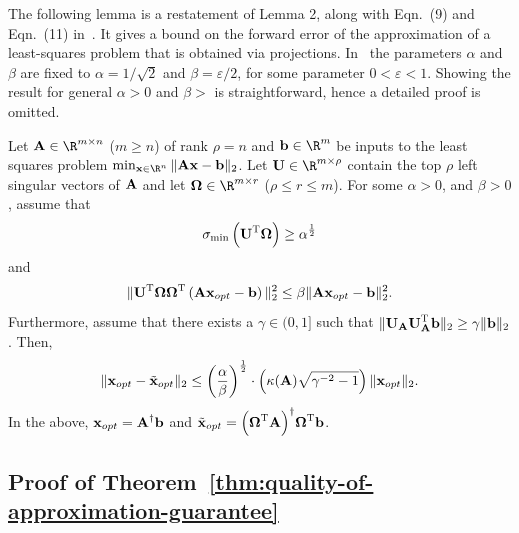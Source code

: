 The following lemma is a restatement of Lemma 2, along with Eqn.~(9) and Eqn.~(11) in~\cite{DMMS11}. It gives a bound on the forward error of the
approximation of a least-squares problem that is obtained via projections.
In~\cite{DMMS11} the parameters $\alpha$ and $\beta$ are fixed to $\alpha=1/\sqrt{2}$ and $\beta = \varepsilon/2$, for some parameter $0 < \varepsilon < 1$.
Showing the result for general $\alpha > 0$ and $\beta >$ is straightforward, hence a detailed proof is omitted.
\begin{lemma}\label{lem:last}
Let $\matA \in \R^{m \times n}$ ($m \ge n$) of rank $\rho=n$ and $\b \in \R^m$ be inputs to the least squares problem $\min_{\x \in \R^n}\TNorm{\matA \x -\b}$.
Let $\matU \in \R^{m \times \rho}$ contain the top $\rho$ left singular vectors of ${\bm{\mathrm{A}}}$ and let $\matOmega \in \R^{m \times r}$ ($\rho \le r \le m $).
For some $\alpha>0$, and $\beta > 0$, assume that
\begin{equation}\label{eqn:first}
\sigma_{\min}\left( \matU\transp \matOmega \right) \ge \alpha^{\frac{1}{2}}
\end{equation}
and
\begin{equation}\label{eqn:second}
\TNormS{\matU\transp \matOmega \matOmega\transp \left( \matA \x_{opt} - \b \right)} \le \beta \TNormS{ \matA \x_{opt} - \b }.
\end{equation}
Furthermore, assume that there exists a $\gamma \in (0,1]$ such that $ \mbox{}\|{\bm{\mathrm{U}}}_{{\bm{\mathrm{A}}}} {\bm{\mathrm{U}}}_{{\bm{\mathrm{A}}}}^{\textsc{T}}{\mathbf b}\|_2 \ge \gamma \mbox{}\|{\mathbf b}\|_2$.
Then,
\begin{equation}\label{eqn:third}
 \TNorm{ \x_{opt} - \tilde{\x}_{opt} } \le \left( \frac{\alpha}{\beta} \right)^{\frac{1}{2}} \cdot \left( \kappa{ \left( \matA \right)} \sqrt{ \gamma^{-2}   - 1 } \right) \TNorm{\x_{opt}}.
\end{equation}
In the above, ${\mathbf x}_{opt} = {{\bm{\mathrm{A}}}}^\dagger {\mathbf b}$ and $\tilde{{\mathbf x}}_{opt} = { \left( {\bm{\mathrm{\Omega}}}^{\textsc{T}} {\bm{\mathrm{A}}} \right) }^\dagger {\ensuremath{\bm{\mathrm{\Omega}}}}^{\textsc{T}} {\mathbf b}$.
\end{lemma}


\subsection{Proof of Theorem~\ref{thm:quality-of-approximation-guarantee}} \label{sec:guarantees}

